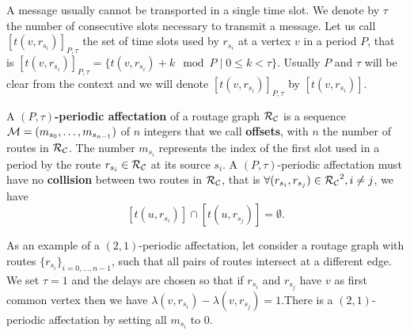 \documentclass[a4paper,10pt]{article}
\begin{document}
      A message usually cannot be transported in a single time slot. We denote by $\tau$ the number 
      of consecutive slots necessary to transmit a message. Let us call $[t(v,r_{s_i})]_{P,\tau}$ the set of time slots used by $r_{s_i}$ at a vertex $v$ in a period $P$, that is $[t(v,r_{s_i})]_{P,\tau} = \{t(v,r_{s_i}) + k \mod P \mid 0 \leq k < \tau \}$. Usually $P$ and $\tau$ will be clear from the context and we will denote $[t(v,r_{s_i})]_{P,\tau}$ by $[t(v,r_{s_i})]$.
      
      
      A {\bf $(P,\tau)$-periodic affectation} of a routage graph $\cal R_{\cal C}$ is a sequence  ${\cal M}=(m_{s_0}, \ldots ,m_{s_{n-1}})$ of $n$ integers that we call {\bf offsets}, with $n$ the number of routes in $\cal R_{\cal C}$. The number $m_{s_i}$ represents the index of the first slot used in a period  by the route $r_{s_i} \in \cal R_{\cal C}$ at its source $s_i$.
      A $(P,\tau)$-periodic affectation must have no {\bf collision} between two routes in $\cal R_{\cal C}$, that is $\forall (r_{s_i}, r_{s_j}) \in {\cal R_{\cal C}}^2, i \neq j$, %
      we have $$[t(u,r_{s_i})] \cap [t(u,r_{s_j})] = \emptyset .$$
      

      As an example of a $(2,1)$-periodic affectation, let consider a routage graph with routes $\{r_{s_i}\}_{i=0,\dots,n-1}$, such that all pairs of routes intersect at a different edge.
      We set $\tau = 1$ and the delays are chosen so that if $r_{s_i}$ and $r_{s_j}$ have $v$ as first common vertex then we have $\lambda(v,r_{s_i}) - \lambda(v,r_{s_j})=1$.There is a $(2,1)$-periodic affectation by setting all $m_{s_i}$ to $0$.

%       
%       
  
\end{document}
